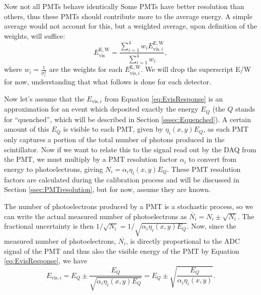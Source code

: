 Now not all PMTs behave identically Some PMTs have better resolution than others, thus these PMTs
should contribute more to the average energy. A simple average would not account for this, but
a weighted average, upon definition of the weights, will suffice:
%
\begin{equation}
  E_{\mathrm{vis}}^\mathrm{E,W} = \frac{\sum_{i=1}^{4} w_i E_{\mathrm{vis},i}^{\mathrm{E,W}}}{\sum_{i=1}^{4} w_i},
\end{equation}
%
where $w_i=\frac{1}{\sigma_i^2}$ are the weights for each $E_{\mathrm{vis},i}^{\mathrm{E,W}}$. We will drop the superscript
E/W for now, understanding that what follows is done for each detector.

Now let's assume that the $E_{\mathrm{vis},i}$ from Equation \ref{eq:EvisResponse} is an approximation
for an event which deposited exactly the energy $E_Q$ (the $Q$ stands for ``quenched'', which will
be described in Section \ref{sssec:Equenched}). A certain amount of this $E_Q$ is visible to each
PMT, given by $\eta_i(x,y)E_Q$, as each PMT only captures a portion of the total number of photons produced
in the scintillator.
Now if we want to relate this to the signal read out by the DAQ
from the PMT, we must multiply by a PMT resolution factor $\alpha_i$ to convert from energy
to photoelectrons, giving $N_i = \alpha_i \eta_i(x,y) E_Q$.
These PMT resolution factors are calculated during the calibration process
and will be discussed in Section \ref{ssec:PMTresolution}, but for now, assume they are known.

The number of photoelectrons produced by a PMT is a stochastic process, so we can write the actual
measured number of photoelectrons as $\overline{N_i} = N_i \pm \sqrt{N_i}$. The fractional uncertainty
is then $1/\sqrt{N_i} = 1/\sqrt{\alpha_i \eta_i(x,y) E_Q}$. Now, since the measured number of photoelectrons,
$\overline{N_i}$, is directly proportional to the ADC signal of the PMT and thus also the visible energy
of the PMT by Equation \ref{eq:EvisResponse}, we have
%
\begin{equation}
  E_{\mathrm{vis},i} = E_Q \pm \frac{E_Q}{\sqrt{\alpha_i \eta_i(x,y) E_Q}} =  E_Q \pm \sqrt{\frac{E_Q}{\alpha_i \eta_i(x,y)}}.
  \label{eq:Evisi}
\end{equation}
%

